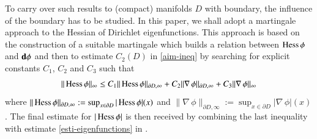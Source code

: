 \documentclass[11pt,reqno]{amsart}
\theoremstyle{definition} \newtheorem{remark}[theorem]{Remark}
\numberwithin{equation}{section}
\newcommand\1{\mathbbm{1}}
\begin{document}
To carry over such results to (compact) manifolds $D$ with boundary, the
influence of the boundary has to be studied.  In this paper, we
shall adopt a martingale approach to the Hessian of
Dirichlet eigenfunctions. This approach is based on the construction of a suitable
martingale which builds a relation between $\operatorname{Hess}\phi$ and ${\bf d}\phi$ and then
to estimate $C_2(D)$ in \eqref{aim-ineq} by searching for explicit
constants $C_1$, $C_2$ and $C_3$ such that
\begin{align}\label{Hess-ineq}
  \|\operatorname{Hess}\phi\|_{\infty}\leq C_1\|\operatorname{Hess} \phi\|_{\partial D,\infty}+C_2 \|\nabla\,\phi\|_{\partial D,\infty}+C_3\|\nabla\,\phi\|_{\infty}
\end{align}
where
$\|\operatorname{Hess} \phi\|_{\partial D, \infty}:=\sup_{x\in \partial D} |\operatorname{Hess}
\phi|(x)$ and
$\|\nabla\, \phi\|_{\partial D, \infty}:=\sup_{x\in \partial D}
|\nabla\, \phi|(x)$.  The final estimate for $|\operatorname{Hess} \phi|$ is then
received by combining the last inequality with estimate
\eqref{esti-eigenfunctions} in \cite{ATW}. 
\end{document}

